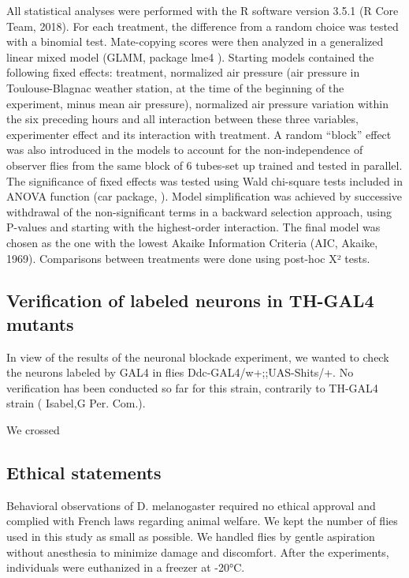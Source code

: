 \documentclass[a4paper, 12pt]{article}
\begin{document}
	All statistical analyses were performed with the R software version 3.5.1 (R Core Team, 2018).
	For each treatment, the difference from a random choice was tested with a binomial test. Mate-copying scores were then analyzed in a generalized linear mixed model (GLMM, package lme4 \parencite{bates_fitting_2015}). Starting models contained the following fixed effects: treatment, normalized air pressure (air pressure in Toulouse-Blagnac weather station, at the time of the beginning of the experiment, minus mean air pressure), normalized air pressure variation within the six preceding hours and all interaction between these three variables, experimenter effect and its interaction with treatment. A random “block” effect was also introduced in the models to account for the non-independence of observer flies from the same block of 6 tubes-set up trained and tested in parallel. The significance of fixed effects was tested using Wald chi-square tests included in ANOVA function (car package, \textcite{fox_r_2018} ). Model simplification was achieved by successive withdrawal of the non-significant terms in a backward selection approach, using P-values and starting with the highest-order interaction. The final model was chosen as the one with the lowest Akaike Information Criteria (AIC, Akaike, 1969). Comparisons between treatments were done using post-hoc X² tests. 
	
	\subsection{Verification of labeled neurons in TH-GAL4 mutants}
	
	In view of the results of the neuronal blockade experiment, we wanted to check the neurons labeled by GAL4 in flies Ddc-GAL4/w+;;UAS-Shits/+. No verification has been conducted so far for this strain, contrarily to TH-GAL4 strain ( Isabel,G Per. Com.).
	
	We crossed
	
	\subsection{Ethical statements}

	Behavioral observations of D. melanogaster required no ethical approval and complied with French laws regarding animal welfare. We kept the number of flies used in this study as small as possible. We handled flies by gentle aspiration without anesthesia to minimize damage and discomfort. After the experiments, individuals were euthanized in a freezer at -20°C.
\end{document}
